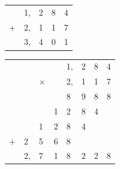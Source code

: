 \begin{center}
\begin{tabular}{@{}c*{4}{@{\,}c}@{}}
  & 1{,} & 2 & 8 & 4 \\
+ & 2{,} & 1 & 1 & 7 \\
\hline 
\vrule height8pt width0pt  & 3{,} & 4 & 0 & 1 
\end{tabular}
\hspace{5mm}
\begin{tabular}{@{}c@{\,}l@{}l@{\,}l@{\,}l@{}l@{\,}l@{\,}l@{}}
& & & 	   & 1{,} & 2 & 8 & 4 \\
& & $\times$\hspace{-1mm} & & 2{,} & 1 & 1 & 7 \\
\hline 
\vrule height8pt width0pt	&      &   &   & 8 & 9 & 8 & 8 \\
	& 	   &   & 1 & 2 & 8 & 4 & \\
	& 	   & 1 & 2 & 8 & 4 &   & \\
$+$ & 2    & 5 & 6 & 8 &   &   & \\
\hline
\vrule height8pt width0pt    & 2{,} & 7 & 1 & 8 & 2 & 2 & 8
\end{tabular}
\end{center}